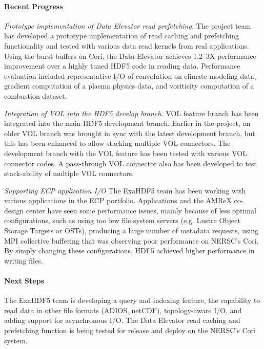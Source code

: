 \paragraph{Recent Progress}
\emph{Prototype implementation of Data Elevator read prefetching.} The project team has developed a prototype implementation of read caching and prefetching functionality and tested with various data read kernels from real applications. Using the burst buffers on Cori, the Data Elevator achieves 1.2--3X performance improvement over a highly tuned HDF5 code in reading data. Performance evaluation included representative I/O of convolution on climate modeling data, gradient computation of a plasma physics data, and voriticity computation of a combustion dataset. 

\emph{Integration of VOL into the HDF5 develop branch. } VOL feature branch has been integrated into the main HDF5 development branch. Earlier in the project, an older VOL branch was brought in sync with the latest development branch, but this has been enhanced to allow stacking multiple VOL connectors. The development branch with the VOL feature has been tested with various VOL connector codes. A pass-through VOL connector also has been developed to test stack-ability of multiple VOL connectors. 

\emph{Supporting ECP application I/O}
The ExaHDF5 team has been working with various applications in the ECP portfolio. Applications and the AMReX co-design center have seen some performance issues, mainly because of less optimal configurations, such as using too few file system servers (e.g. Lustre Object Storage Targets or OSTs), producing a large number of metadata requests, using MPI collective buffering that was observing poor performance on NERSC's Cori. By simply changing these configurations, HDF5 achieved higher performance in writing files. 

\paragraph{Next Steps}

The ExaHDF5 team is developing a query and indexing feature, the capability to read data in other file formats (ADIOS, netCDF), topology-aware I/O, and adding support for asynchronous I/O. The Data Elevator read caching and prefetching function is being tested for release and deploy on the NERSC's Cori system. 
